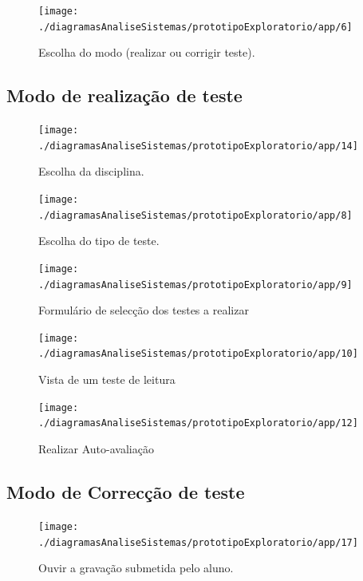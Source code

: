\documentclass[a4paper]{article}
\begin{document}
\begin{figure}[h]
\centering
\texttt{[image: ./diagramasAnaliseSistemas/prototipoExploratorio/app/6]}
\caption{Escolha do modo (realizar ou corrigir teste).}
\label{fig:6}
\end{figure}

\newpage

\subsection{Modo de realização de teste}

\begin{figure}[h]
\centering
\texttt{[image: ./diagramasAnaliseSistemas/prototipoExploratorio/app/14]}
\caption{Escolha da disciplina.}
\label{fig:14}
\end{figure}

\begin{figure}[h]
\centering
\texttt{[image: ./diagramasAnaliseSistemas/prototipoExploratorio/app/8]}
\caption{Escolha do tipo de teste.}
\label{fig:8}
\end{figure}
\newpage

\begin{figure}[h]
\centering
\texttt{[image: ./diagramasAnaliseSistemas/prototipoExploratorio/app/9]}
\caption{Formulário de selecção dos testes a realizar}
\label{fig:9}
\end{figure}

\begin{figure}[h]
\centering
\texttt{[image: ./diagramasAnaliseSistemas/prototipoExploratorio/app/10]}
\caption{Vista de um teste de leitura}
\label{fig:10}
\end{figure}

\newpage

\begin{figure}[h]
\centering
\texttt{[image: ./diagramasAnaliseSistemas/prototipoExploratorio/app/12]}
\caption{Realizar Auto-avaliação}
\label{fig:12}
\end{figure}

\newpage

\subsection{Modo de Correcção de teste}


\begin{figure}[h]
\centering
\texttt{[image: ./diagramasAnaliseSistemas/prototipoExploratorio/app/17]}
\caption{Ouvir a gravação submetida pelo aluno.}
\label{fig:17}
\end{figure}
\end{document}
